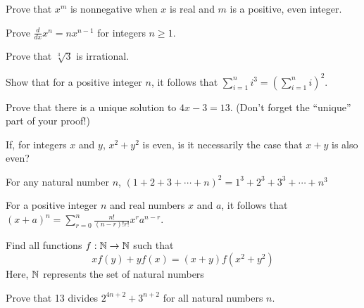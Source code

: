 \begin{exercise}
    Prove that $x^m$ is nonnegative when $x$ is real and $m$ is a positive, even integer.
\end{exercise}
\vspace{-5mm}
\begin{exercise}[Calculus]
    Prove $\frac{d}{dx} x^n = nx^{n-1}$ for integers $n\geq 1$.
\end{exercise}
\vspace{-5mm}
\begin{exercise}
    Prove that $\sqrt[3]{3}$ is irrational.
\end{exercise}
\vspace{-5mm}
\begin{exercise}
    Show that for a positive integer $n$, it follows that $\sum_{i=1}^n i^3 = \left(\sum_{i=1}^n i\right)^2$.
\end{exercise}
\vspace{-5mm}
\begin{exercise}
    Prove that there is a unique solution to $4x-3=13$. (Don't forget the ``unique'' part of your proof!)
\end{exercise}
\vspace{-5mm}
\begin{exercise}
    If, for integers $x$ and $y$, $x^2+y^2$ is even, is it necessarily the case that $x+y$ is also even? 
\end{exercise}
\vspace{-5mm}
\begin{exercise}
    For any natural number $n$, $(1+2+3+\cdots +n)^2 = 1^3+2^3+3^3+\cdots +n^3$
\end{exercise}
\vspace{-5mm}
\begin{exercise}
    For a positive integer $n$ and real numbers $x$ and $a$, it follows that $(x+a)^n=\sum_{r=0}^n \frac{n!}{(n-r)!r!} x^r a^{n-r}$.
\end{exercise}
\vspace{-5mm}
\begin{exercise}
    Find all functions $f : \mathbb{N}\to\mathbb{N}$ such that $$xf(y)+yf(x)=(x+y)f(x^2+y^2)$$
    Here, $\mathbb{N}$ represents the set of natural numbers
\end{exercise}
\vspace{-5mm}
\begin{exercise}
    Prove that 13 divides $2^{4n+2}+3^{n+2}$ for all natural numbers $n$.
\end{exercise}

